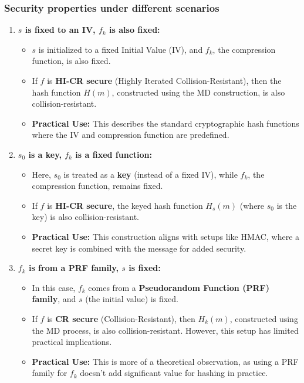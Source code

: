 \subsubsection{Security properties under different scenarios}
\begin{enumerate}
    \item \textbf{\( s \) is fixed to an IV, \( f_k \) is also fixed:}
    \begin{itemize}
        \item \( s \) is initialized to a fixed Initial Value (IV), and \( f_k \), the compression function, is also fixed.
        \item If \( f \) is \textbf{HI-CR secure} (Highly Iterated Collision-Resistant), then the hash function \( H(m) \), constructed using the MD construction, is also collision-resistant.
        \item \textbf{Practical Use:} This describes the standard cryptographic hash functions where the IV and compression function are predefined.
    \end{itemize}
    
    \item \textbf{\( s_0 \) is a key, \( f_k \) is a fixed function:}
    \begin{itemize}
        \item Here, \( s_0 \) is treated as a \textbf{key} (instead of a fixed IV), while \( f_k \), the compression function, remains fixed.
        \item If \( f \) is \textbf{HI-CR secure}, the keyed hash function \( H_s(m) \) (where \( s_0 \) is the key) is also collision-resistant.
        \item \textbf{Practical Use:} This construction aligns with setups like HMAC, where a secret key is combined with the message for added security.
    \end{itemize}
    
    \item \textbf{\( f_k \) is from a PRF family, \( s \) is fixed:}
    \begin{itemize}
        \item In this case, \( f_k \) comes from a \textbf{Pseudorandom Function (PRF) family}, and \( s \) (the initial value) is fixed.
        \item If \( f \) is \textbf{CR secure} (Collision-Resistant), then \( H_k(m) \), constructed using the MD process, is also collision-resistant. However, this setup has limited practical implications.
        \item \textbf{Practical Use:} This is more of a theoretical observation, as using a PRF family for \( f_k \) doesn’t add significant value for hashing in practice.
    \end{itemize}
\end{enumerate}

